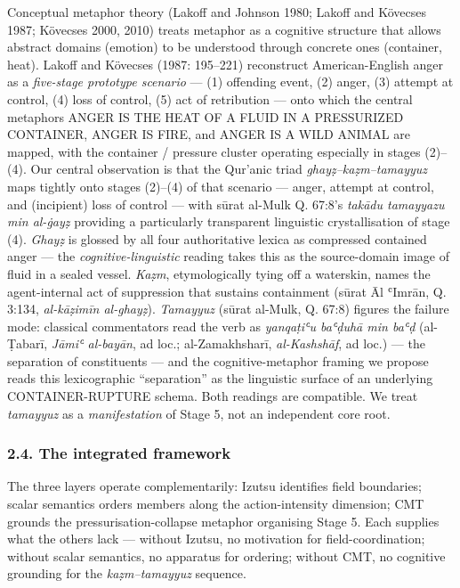 Conceptual metaphor theory (Lakoff and Johnson 1980; Lakoff and Kövecses
1987; Kövecses 2000, 2010) treats metaphor as a cognitive structure that
allows abstract domains (emotion) to be understood through concrete ones
(container, heat). Lakoff and Kövecses (1987: 195--221) reconstruct
American-English anger as a \emph{five-stage prototype scenario} --- (1)
offending event, (2) anger, (3) attempt at control, (4) loss of control,
(5) act of retribution --- onto which the central metaphors ANGER IS THE
HEAT OF A FLUID IN A PRESSURIZED CONTAINER, ANGER IS FIRE, and ANGER IS
A WILD ANIMAL are mapped, with the container / pressure cluster
operating especially in stages (2)--(4). Our central observation is that
the Qur'anic triad \emph{ghayẓ--kaẓm--tamayyuz} maps tightly onto stages
(2)--(4) of that scenario --- anger, attempt at control, and (incipient)
loss of control --- with sūrat al-Mulk Q. 67:8's \emph{takādu tamayyazu
min al-ġayẓ} providing a particularly transparent linguistic
crystallisation of stage (4). \emph{Ghayẓ} is glossed by all four
authoritative lexica as compressed contained anger --- the
\emph{cognitive-linguistic} reading takes this as the source-domain
image of fluid in a sealed vessel. \emph{Kaẓm}, etymologically tying off
a waterskin, names the agent-internal act of suppression that sustains
containment (sūrat Āl ʿImrān, Q. 3:134, \emph{al-kāẓimīn al-ghayẓ}).
\emph{Tamayyuz} (sūrat al-Mulk, Q. 67:8) figures the failure mode:
classical commentators read the verb as \emph{yanqaṭiʿu baʿḍuhā min
baʿḍ} (al-Ṭabarī, \emph{Jāmiʿ al-bayān}, ad loc.; al-Zamakhsharī,
\emph{al-Kashshāf}, ad loc.) --- the separation of constituents --- and
the cognitive-metaphor framing we propose reads this lexicographic
``separation'' as the linguistic surface of an underlying
CONTAINER-RUPTURE schema. Both readings are compatible. We treat
\emph{tamayyuz} as a \emph{manifestation} of Stage 5, not an independent
core root.

\subsubsection{2.4. The integrated
framework}\label{the-integrated-framework}

The three layers operate complementarily: Izutsu identifies field
boundaries; scalar semantics orders members along the action-intensity
dimension; CMT grounds the pressurisation-collapse metaphor organising
Stage 5. Each supplies what the others lack --- without Izutsu, no
motivation for field-coordination; without scalar semantics, no
apparatus for ordering; without CMT, no cognitive grounding for the
\emph{kaẓm--tamayyuz} sequence.

